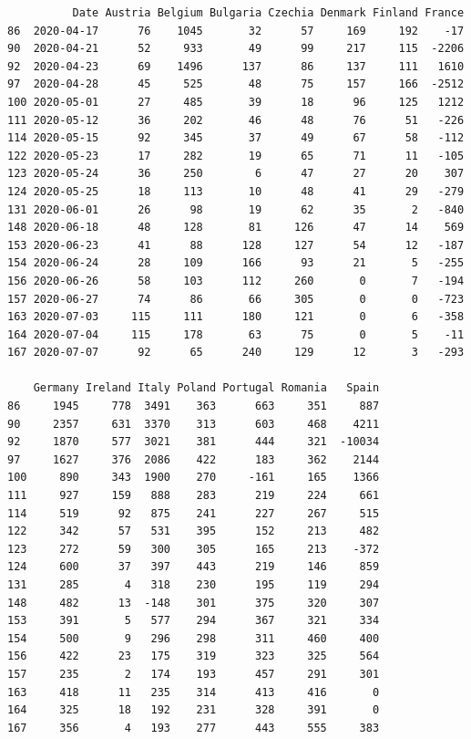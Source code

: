 \documentclass[a4paper]{article}
\begin{document}
        \begin{verbatim}
          Date Austria Belgium Bulgaria Czechia Denmark Finland France
86  2020-04-17      76    1045       32      57     169     192    -17   
90  2020-04-21      52     933       49      99     217     115  -2206   
92  2020-04-23      69    1496      137      86     137     111   1610   
97  2020-04-28      45     525       48      75     157     166  -2512   
100 2020-05-01      27     485       39      18      96     125   1212   
111 2020-05-12      36     202       46      48      76      51   -226   
114 2020-05-15      92     345       37      49      67      58   -112   
122 2020-05-23      17     282       19      65      71      11   -105   
123 2020-05-24      36     250        6      47      27      20    307   
124 2020-05-25      18     113       10      48      41      29   -279   
131 2020-06-01      26      98       19      62      35       2   -840   
148 2020-06-18      48     128       81     126      47      14    569   
153 2020-06-23      41      88      128     127      54      12   -187   
154 2020-06-24      28     109      166      93      21       5   -255   
156 2020-06-26      58     103      112     260       0       7   -194   
157 2020-06-27      74      86       66     305       0       0   -723   
163 2020-07-03     115     111      180     121       0       6   -358   
164 2020-07-04     115     178       63      75       0       5    -11   
167 2020-07-07      92      65      240     129      12       3   -293   

    Germany Ireland Italy Poland Portugal Romania   Spain  
86     1945     778  3491    363      663     351     887  
90     2357     631  3370    313      603     468    4211  
92     1870     577  3021    381      444     321  -10034  
97     1627     376  2086    422      183     362    2144  
100     890     343  1900    270     -161     165    1366  
111     927     159   888    283      219     224     661  
114     519      92   875    241      227     267     515  
122     342      57   531    395      152     213     482  
123     272      59   300    305      165     213    -372  
124     600      37   397    443      219     146     859  
131     285       4   318    230      195     119     294  
148     482      13  -148    301      375     320     307  
153     391       5   577    294      367     321     334  
154     500       9   296    298      311     460     400  
156     422      23   175    319      323     325     564  
157     235       2   174    193      457     291     301  
163     418      11   235    314      413     416       0  
164     325      18   192    231      328     391       0  
167     356       4   193    277      443     555     383  
    \end{verbatim}
\end{document}
